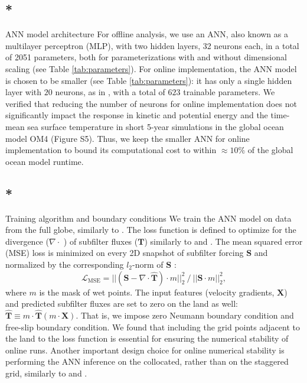 \documentclass[draft,grl]{agutexSI2019}
\begin{document}
\begin{article}
\subsection{*}{ANN model architecture}
For offline analysis, we use an ANN, also known as a multilayer perceptron (MLP), with two hidden layers, 32 neurons each, in a total of 2051 parameters, both for parameterizations with and without dimensional scaling (see Table \ref{tab:parameters}). For online implementation, the ANN model is chosen to be smaller (see Table \ref{tab:parameters}): it has only a single hidden layer with $20$ neurons, as in , with a total of $623$ trainable parameters. We verified that reducing the number of neurons for online implementation does not significantly impact the response in kinetic and potential energy and the time-mean sea surface temperature in short 5-year simulations in the global ocean model OM4 (Figure S5). Thus, we keep the smaller ANN for online implementation to bound its computational cost to within $\approx 10\%$ of the global ocean model runtime.

\subsection{*}{Training algorithm and boundary conditions}
We train the ANN model on data from the full globe, similarly to . The loss function is defined to optimize for the divergence ($\nabla \cdot$ ) of subfilter fluxes (${\mathbf{T}}$) similarly to  and . The mean squared error (MSE) loss is minimized on every 2D snapshot of subfilter forcing $\mathbf{S}$ and normalized by the corresponding $l_2$-norm of $\mathbf{S}$ \cite{agdestein2025discretize}:
\begin{equation}
\mathcal{L}_{\mathrm{MSE}} = ||(\mathbf{S} - \nabla \cdot \widehat{\mathbf{T}}) \cdot m ||_2^2 ~ / ~||\mathbf{S} \cdot m||_2^2, \label{eq:mse_loss}
\end{equation}
where $m$ is the mask of wet points. The
input features (velocity gradients, $\mathbf{X}$) and predicted subfilter fluxes are set to zero on the land as well: $\widehat{\mathbf{T}}\equiv m \cdot \widehat{\mathbf{T}}(m \cdot \mathbf{X})$. That is, we impose zero Neumann boundary condition \cite{zhang2024addressing} and free-slip boundary condition. We found that including the grid points adjacent to the land to the loss function is essential for ensuring the numerical stability of online runs. Another important design choice for online numerical stability is performing the ANN inference on the collocated, rather than on the staggered grid, similarly to  and  . 


\end{article}
\end{document}
